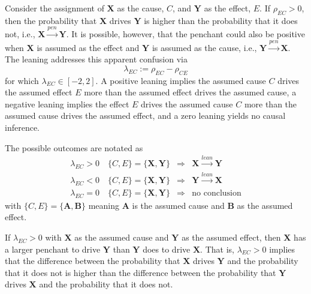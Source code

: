 \documentclass{article}[10pt]
\begin{document}
Consider the assignment of $\mathbf{X}$ as the cause, $C$, and $\mathbf{Y}$ as the effect, $E$.  If $\rho_{EC}>0$, then the probability that $\mathbf{X}$ drives $\mathbf{Y}$ is higher than the probability that it does not, i.e., $\mathbf{X}\xrightarrow{pen}\mathbf{Y}$.  It is possible, however, that the penchant could also be positive when $\mathbf{X}$ is assumed as the effect and $\mathbf{Y}$ is assumed as the cause, i.e., $\mathbf{Y}\xrightarrow{pen}\mathbf{X}$.  The leaning addresses this apparent confusion via
\begin{equation}
\label{eq:leaning}
\lambda_{EC} := \rho_{EC} - \rho_{CE}
\end{equation}
for which $\lambda_{EC}\in\left[-2,2\right]$. A positive leaning implies the assumed cause $C$ drives the assumed effect $E$ more than the assumed effect drives the assumed cause, a negative leaning implies the effect $E$ drives the assumed cause $C$ more than the assumed cause drives the assumed effect, and a zero leaning yields no causal inference.  

The possible outcomes are notated as
\begin{eqnarray*}
\lambda_{EC}>0 \quad\{C,E\} = \{\mathbf{X},\mathbf{Y}\}&\Rightarrow&\mathbf{X}\xrightarrow{lean}\mathbf{Y}\\
\lambda_{EC}<0\quad\{C,E\} = \{\mathbf{X},\mathbf{Y}\}&\Rightarrow&\mathbf{Y}\xrightarrow{lean}\mathbf{X}\\
\lambda_{EC}=0\quad\{C,E\} = \{\mathbf{X},\mathbf{Y}\}&\Rightarrow& \mbox{no conclusion}
\end{eqnarray*}
with $\{C,E\} = \{\mathbf{A},\mathbf{B}\}$ meaning $\mathbf{A}$ is the assumed cause and $\mathbf{B}$ as the assumed effect.

If $\lambda_{EC}>0$ with $\mathbf{X}$ as the assumed cause and $\mathbf{Y}$ as the assumed effect, then $\mathbf{X}$ has a larger penchant to drive $\mathbf{Y}$ than $\mathbf{Y}$ does to drive $\mathbf{X}$.  That is, $\lambda_{EC}>0$ implies that the difference between the probability that $\mathbf{X}$ drives $\mathbf{Y}$ and the probability that it does not is higher than the difference between the probability that $\mathbf{Y}$ drives $\mathbf{X}$ and the probability that it does not.  
\end{document}
